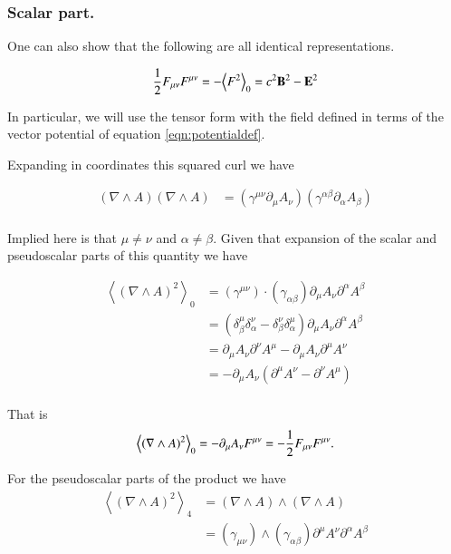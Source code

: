 \documentclass{article}
\newcommand{\gpgrade}[2] {{\left\langle{{#1}}\right\rangle}_{#2}}
\newcommand{\gpgradezero}[1] {\gpgrade{#1}{0}}
\newcommand{\grad}[0]{\nabla}
\begin{document}
\subsubsection{ Scalar part. }

One can also show that the following are all identical representations.

\begin{equation}
\inv{2} F_{\mu\nu}F^{\mu\nu} = -\gpgradezero{F^2} = c^2 \BB^2 -\BE^2
\end{equation}

In particular, we will use the tensor form with the field defined in terms of the vector potential of equation \ref{eqn:potentialdef}.

Expanding in coordinates this squared curl we have

\begin{align*}
(\grad \wedge A) (\grad \wedge A)
&= (\gamma^{\mu\nu} \partial_{\mu} A_{\nu})(\gamma^{\alpha\beta} \partial_{\alpha} A_{\beta}) \\
\end{align*}

Implied here is that $\mu \ne \nu$ and $\alpha \ne \beta$.  Given that expansion of the scalar and pseudoscalar parts of this quantity we have

\begin{align*}
\gpgradezero{ (\grad \wedge A)^2 }
&= (\gamma^{\mu\nu}) \cdot (\gamma_{\alpha\beta}) \partial_{\mu} A_{\nu} \partial^{\alpha} A^{\beta} \\
&= \left(\delta^{\mu}_{\beta} \delta^{\nu}_{\alpha} - \delta^{\nu}_{\beta} \delta^{\mu}_{\alpha}\right) \partial_{\mu} A_{\nu} \partial^{\alpha} A^{\beta} \\
&= \partial_{\mu} A_{\nu} \partial^{\nu} A^{\mu} -\partial_{\mu} A_{\nu} \partial^{\mu} A^{\nu} \\
&= -\partial_{\mu} A_{\nu} \left( \partial^{\mu} A^{\nu} - \partial^{\nu} A^{\mu} \right) \\
\end{align*}

That is
\begin{equation}
\gpgradezero{ (\grad \wedge A)^2 } = -\partial_{\mu} A_{\nu} F^{\mu\nu} = -\inv{2} F_{\mu\nu}F^{\mu\nu}.
\end{equation}

For the pseudoscalar parts of the product we have
\begin{align*}
\gpgrade{ (\grad \wedge A)^2 }{4} &= (\grad \wedge A) \wedge (\grad \wedge A) \\
&= (\gamma_{\mu\nu}) \wedge (\gamma_{\alpha\beta}) \partial^{\mu} A^{\nu} \partial^{\alpha} A^{\beta} \\
\end{align*}
\end{document}
